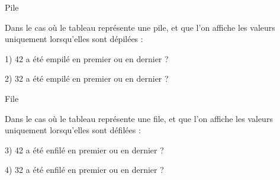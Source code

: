 \documentclass[11pt,a4paper]{article}
\begin{document}
\begin{center}
\begin{table}[ht!]
\begin{minipage}{0.15\textwidth}
  \end{minipage}
\end{table}

\vspace*{-0.5cm}

\begin{table}[ht!]
  \centering
  \begin{minipage}{0.45\textwidth}
    \centering
Pile

Dans le cas où le tableau représente une pile, et que l'on affiche les valeurs uniquement lorsqu'elles sont dépilées :

\smallskip

\raggedright
1) 42 a été empilé en premier ou en dernier ?

\bigskip
\bigskip
\bigskip

2) 32 a été empilé en premier ou en dernier ?

\bigskip
\bigskip
\bigskip

  \end{minipage}
  \hfillx
  \begin{minipage}{0.01\textwidth}


  \end{minipage}
  \hfillx
  \begin{minipage}{0.45\textwidth}
    \centering
File

Dans le cas où le tableau représente une file, et que l'on affiche les valeurs uniquement lorsqu'elles sont défilées :

\smallskip

\raggedright
3) 42 a été enfilé en premier ou en dernier ?

\bigskip
\bigskip
\bigskip

4) 32 a été enfilé en premier ou en dernier ?

\bigskip
\bigskip
\bigskip

  \end{minipage}
\end{table}

\end{center}
\end{document}
